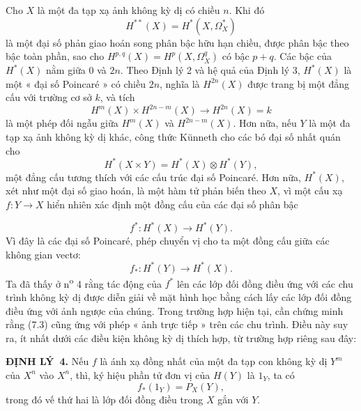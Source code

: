 \documentclass[11pt,twoside,openany]{book}
\numberwithin{equation}{section}
\newcommand{\src}[1]{%
  \phantomsection\hypertarget{src:\fgasourceid:#1}{}%
  \marginpar{\raggedleft\footnotesize\sffamily #1}%
}
\newcommand{\fgasourceid}{unset}
\newcommand{\result}[2]{\par\medskip\noindent\textbf{#1\if\relax\detokenize{#2}\relax\else\ #2\fi.}\quad}
\begin{document}
Cho $X$ là một đa tạp xạ ảnh không kỳ dị có chiều $n$. Khi đó
\[
  H^{**}(X)=H^{*}(X,\Omega_X^{*})
\]
là một đại số phản giao hoán song phân bậc hữu hạn chiều, được phân bậc
theo bậc toàn phần, sao cho $H^{p,q}(X)=H^{p}(X,\Omega_X^{q})$ có bậc
$p+q$. Các bậc của $H^{*}(X)$ nằm giữa $0$ và $2n$. Theo
Định lý 2 và hệ quả của Định lý 3, $H^{*}(X)$ là một « đại số
Poincaré » có chiều $2n$, nghĩa là $H^{2n}(X)$ được trang bị một đẳng cấu với
trường cơ sở $k$, và tích
\[
  H^{m}(X)\times H^{2n-m}(X)\longrightarrow H^{2n}(X)=k
\]
là một phép đối ngẫu giữa $H^{m}(X)$ và $H^{2n-m}(X)$. Hơn nữa, nếu $Y$ là một
đa tạp xạ ảnh không kỳ dị khác, công thức Künneth cho các
bó đại số nhất quán cho
\begin{equation}\tag{7.1}
  H^{*}(X\times Y)=H^{*}(X)\otimes H^{*}(Y),
\end{equation}
một đẳng cấu tương thích với các cấu trúc đại số Poincaré. Hơn nữa,
$H^{*}(X)$, xét như một đại số giao hoán, là một hàm tử phản biến theo
$X$, vì một cấu xạ $f:Y\longrightarrow X$ hiển nhiên xác định một
đồng cấu của các đại số phân bậc

\src{188}
\begin{equation}\tag{7.2}
  f^{*}:H^{*}(X)\longrightarrow H^{*}(Y).
\end{equation}
Vì đây là các đại số Poincaré, phép chuyển vị cho ta một đồng cấu giữa các
không gian vectơ:
\begin{equation}\tag{7.3}
  f_{*}:H^{*}(Y)\longrightarrow H^{*}(X).
\end{equation}
Ta đã thấy ở n\textsuperscript{o} 4 rằng tác động của $f^{*}$ lên các lớp đối đồng điều
ứng với các chu trình không kỳ dị được diễn giải về mặt hình học bằng cách
lấy các lớp đối đồng điều ứng với ảnh ngược của chúng. Trong trường hợp hiện
tại, cần chứng minh rằng (7.3) cũng ứng với phép « ảnh trực tiếp » trên các
chu trình. Điều này suy ra, ít nhất dưới các điều kiện không kỳ dị thích hợp,
từ trường hợp riêng sau đây:

\result{ĐỊNH LÝ}{4} Nếu $f$ là ánh xạ đồng nhất của một đa tạp con không
kỳ dị $Y^{m}$ của $X^{n}$ vào $X^{n}$, thì, ký hiệu
phần tử đơn vị của $H(Y)$ là $1_Y$, ta có
\begin{equation}\tag{7.4}
  f_{*}(1_Y)=P_X(Y),
\end{equation}
trong đó vế thứ hai là lớp đối đồng điều trong $X$ gắn với $Y$.
\end{document}
